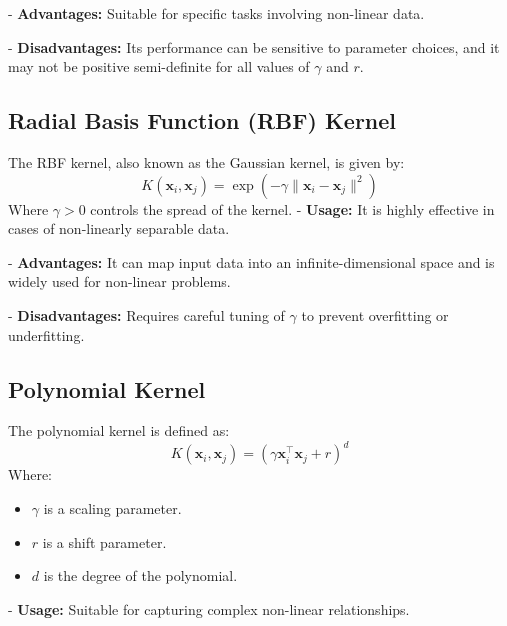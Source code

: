 \documentclass[lettersize,journal]{IEEEtran}
\begin{document}
\vspace{0.1cm}

\hspace{-0.33cm}- \textbf{Advantages:} Suitable for specific tasks involving non-linear data.

\vspace{0.1cm}

\hspace{-0.33cm}- \textbf{Disadvantages:} Its performance can be sensitive to parameter choices, and it may not be positive semi-definite for all values of $\gamma$ and $r$.

\subsection{\textbf{Radial Basis Function (RBF) Kernel}}
The RBF kernel, also known as the Gaussian kernel, is given by:
\[
K(\mathbf{x}_i, \mathbf{x}_j) = \exp\left(-\gamma \|\mathbf{x}_i - \mathbf{x}_j\|^2\right)
\]
Where $\gamma > 0$ controls the spread of the kernel.
- \textbf{Usage:} It is highly effective in cases of non-linearly separable data.

\vspace{0.1cm}

\hspace{-0.33cm}- \textbf{Advantages:} It can map input data into an infinite-dimensional space and is widely used for non-linear problems.

\vspace{0.1cm}

\hspace{-0.33cm}- \textbf{Disadvantages:} Requires careful tuning of $\gamma$ to prevent overfitting or underfitting.

\subsection{\textbf{Polynomial Kernel}}
The polynomial kernel is defined as:
\[
K(\mathbf{x}_i, \mathbf{x}_j) = (\gamma \mathbf{x}_i^\top \mathbf{x}_j + r)^d
\]
Where:
\begin{itemize}
    \item $\gamma$ is a scaling parameter.
    \item $r$ is a shift parameter.
    \item $d$ is the degree of the polynomial.
\end{itemize}
- \textbf{Usage:} Suitable for capturing complex non-linear relationships.

\vspace{0.1cm}
\end{document}
